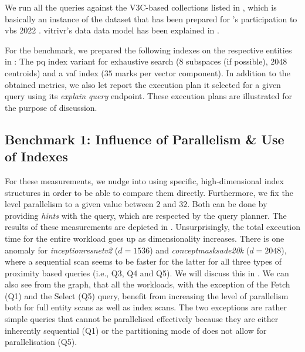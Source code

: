 We run all the queries against the V3C-based collections listed in , which is basically an instance of the dataset that has been prepared for \vitrivr{}'s \cite{Rossetto:2016Vitrivr,Gasser:2019Multimodal} participation to \acrshort{vbs} 2022 \cite{Heller:2022Multi}. vitrivr's data data model has been explained in . 

For the benchmark, we prepared the following indexes on the respective entities in \cottontail{}: The \acrshort{pq} index variant for exhaustive search ($8$ subspaces (if possible), $2048$ centroids) and a \acrshort{vaf} index ($35$ marks per vector component). In addition to the obtained metrics, we also let \cottontail{} report the execution plan it selected for a given query using its \emph{explain query} endpoint. These execution plans are illustrated for the purpose of discussion.

\subsection{Benchmark 1: Influence of Parallelism \& Use of Indexes}
For these measurements, we nudge \cottontail{} into using specific, high-dimensional index structures in order to be able to compare them directly. Furthermore, we fix the level parallelism to a given value between $2$ and $32$. Both can be done by providing \emph{hints} with the query, which are respected by the query planner. The results of these measurements are depicted in . Unsurprisingly, the total execution time for the entire workload goes up as dimensionality increases. There is one anomaly for \emph{inceptionresnetv2} ($d = 1536$) and \emph{conceptmasksade20k} ($d = 2048$), where a sequential scan seems to be faster for the latter for all three types of proximity based queries (i.e., Q3, Q4 and Q5). We will discuss this in . We can also see from the graph, that all the workloads, with the exception of the Fetch (Q1) and the Select (Q5) query, benefit from increasing the level of parallelism both for full entity scans as well as index scans. The two exceptions are rather simple queries that cannot be parallelised effectively because they are either inherently sequential (Q1) or the partitioning mode of \cottontail{} does not allow for parallelisation (Q5). 

